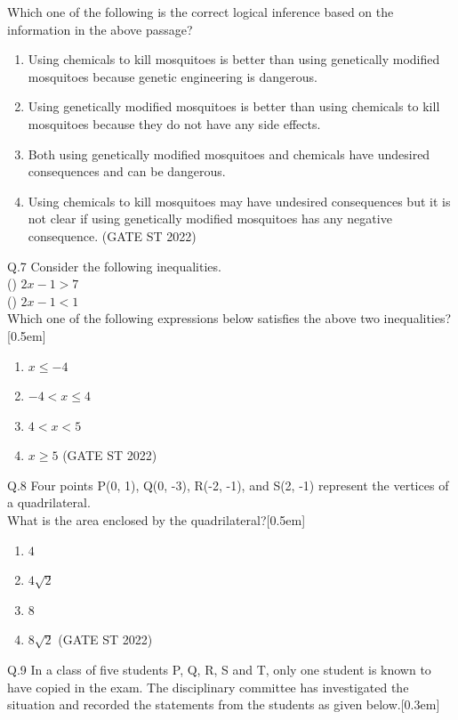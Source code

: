\documentclass[journal,12pt,onecolumn]{IEEEtran}
\theoremstyle{remark}
\begin{document}
Which one of the following is the correct logical inference based on the information in the above passage?
\begin{enumerate}[label=(\Alph*)]
		\item Using chemicals to kill mosquitoes is better than using genetically modified mosquitoes because genetic engineering is dangerous.
		\item Using genetically modified mosquitoes is better than using chemicals to kill mosquitoes because they do not have any side effects.
		\item Both using genetically modified mosquitoes and chemicals have undesired consequences and can be dangerous.
		\item Using chemicals to kill mosquitoes may have undesired consequences but it is not clear if using genetically modified mosquitoes has any negative consequence.
		\hfill (GATE ST 2022)
\end{enumerate} 
	\vspace{2em}
Q.7 Consider the following inequalities.\\
	 () $ 2x - 1 > 7 $ \\
	 () $ 2x - 1 < 1 $ \\
	 Which one of the following expressions below satisfies the above two inequalities?[0.5em]
	 \begin{enumerate}[label=(\Alph*)]
	 	\item $ x \leq -4$
	 	\item $ -4 < x \leq 4 $
	 	\item $ 4 < x < 5 $
	 	\item $ x \geq 5 $
	 	\hfill (GATE ST 2022)
	 \end{enumerate}
	 	\vspace{2em}
Q.8 Four points P(0, 1), Q(0, -3), R(-2, -1), and S(2, -1) represent the vertices of a quadrilateral.\\
	 What is the area enclosed by the quadrilateral?[0.5em]
	 \begin{enumerate}[label=(\Alph*)]
	 	\item $ 4 $
	 	\item $ 4\sqrt{2} $
	 	\item $ 8 $
	 	\item $ 8\sqrt{2} $
	 	\hfill (GATE ST 2022)
	 \end{enumerate}
	 	\vspace{2em}
Q.9 In a class of five students P, Q, R, S and T, only one student is known to have copied in the exam. The disciplinary committee has investigated the situation and recorded the statements from the students as given below.[0.3em]
\end{document}
